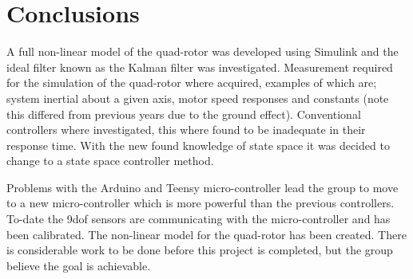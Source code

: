 \chapter{Conclusions}
A full non-linear model of the quad-rotor was developed using Simulink and the ideal filter known as the Kalman filter was investigated. Measurement required for the simulation of the quad-rotor where acquired, examples of which are; system inertial about a given axis, motor speed responses and constants (note this differed from previous years due to the ground effect)\cite{Principles_of_helicopter_aerodynamics}. Conventional controllers where investigated, this where found to be inadequate in their response time. With the new found knowledge of state space it was decided to change to a state space controller method.

Problems with the Arduino and Teensy micro-controller lead the group to move to a new micro-controller which  is more powerful than the previous controllers. To-date the \gls{9dof} sensors  are communicating with the micro-controller and has been calibrated. The non-linear model for the quad-rotor has been created. There is considerable work to be done before this project is completed, but the group believe the goal is achievable. 









